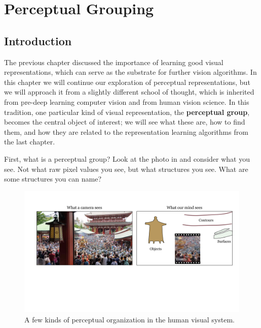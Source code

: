 \chapter{Perceptual Grouping}\label{chapter:perceptual_organization}

\section{Introduction}

The previous chapter discussed the importance of learning good visual representations, which can serve as the substrate for further vision algorithms. In this chapter we will continue our exploration of perceptual representations, but we will approach it from a slightly different school of thought, which is inherited from pre-deep learning computer vision and from human vision science. In this tradition, one particular kind of visual representation, the \textbf{perceptual group}, becomes the central object of interest; we will see what these are, how to find them, and how they are related to the representation learning algorithms from the last chapter.

First, what is a perceptual group? Look at the photo in \fig{\ref{fig:perceptual_organization:perc_org_teaser}} and consider what you see. Not what raw pixel values you see, but what structures you see. What are some structures you can name?
\begin{figure}[h!]
    \centerline{
    \includegraphics[width=1.0\linewidth]{./figures/perceptual_organization/perc_org_teaser.pdf}
    }
    \caption{A few kinds of perceptual organization in the human visual system.}
    \label{fig:perceptual_organization:perc_org_teaser}
\end{figure}


